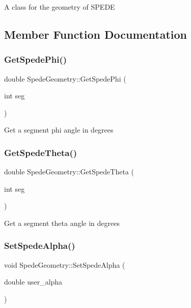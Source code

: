 A class for the geometry of S\+P\+E\+DE 

\subsection{Member Function Documentation}
\mbox{\label{class_spede_geometry_a93bd92636bce1259b189bb17275d238d}} 
\subsubsection{\texorpdfstring{Get\+Spede\+Phi()}{GetSpedePhi()}}
{\footnotesize\ttfamily double Spede\+Geometry\+::\+Get\+Spede\+Phi (\begin{DoxyParamCaption}\item[{int}]{seg }\end{DoxyParamCaption})}

Get a segment phi angle in degrees \mbox{\label{class_spede_geometry_a05865b0752fb518337a9a16f8fba9085}} 
\subsubsection{\texorpdfstring{Get\+Spede\+Theta()}{GetSpedeTheta()}}
{\footnotesize\ttfamily double Spede\+Geometry\+::\+Get\+Spede\+Theta (\begin{DoxyParamCaption}\item[{int}]{seg }\end{DoxyParamCaption})}

Get a segment theta angle in degrees \mbox{\label{class_spede_geometry_a94c3f5b2dbf4490db7d72514c8abe340}} 
\subsubsection{\texorpdfstring{Set\+Spede\+Alpha()}{SetSpedeAlpha()}}
{\footnotesize\ttfamily void Spede\+Geometry\+::\+Set\+Spede\+Alpha (\begin{DoxyParamCaption}\item[{double}]{user\+\_\+alpha }\end{DoxyParamCaption})}

